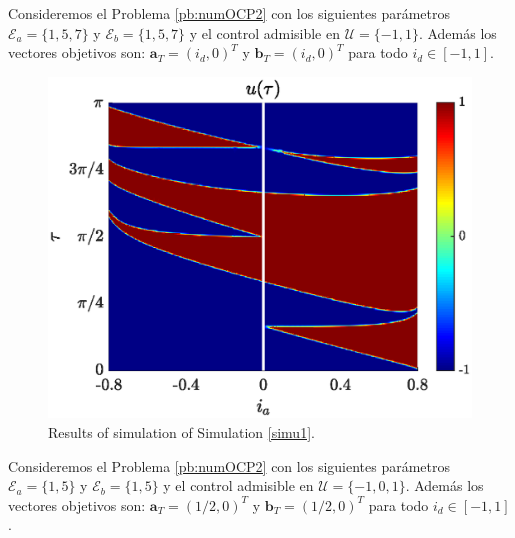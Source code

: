 
\vspace{1em}
\begin{simulation}\label{simu1}
Consideremos el Problema \ref{pb:numOCP2} con los siguientes parámetros $\mathcal{E}_a = \{1,5,7\}$ y  $\mathcal{E}_b = \{1,5,7\}$ y el control admisible en $\mathcal{U} = \{-1,1\}$. Además los vectores objetivos son: $\bm{a}_T = (i_d,0)^T$ y $\bm{b}_T = (i_d,0)^T$ para todo $i_d \in [-1,1]$. 

\begin{figure}[ht!]
    \hspace{0.05em}
    \includegraphics[scale=0.565]{img/fig05.eps}
    \caption{Results of simulation of Simulation \ref{simu1}.}
\end{figure} 
\end{simulation}

\vspace{1em}
\begin{simulation}\label{simu2}

Consideremos el Problema \ref{pb:numOCP2} con los siguientes parámetros $\mathcal{E}_a = \{1,5\}$ y  $\mathcal{E}_b = \{1,5\}$ y el control admisible en $\mathcal{U} = \{-1,0,1\}$. Además los vectores objetivos son: $\bm{a}_T = (1/2,0)^T$ y $\bm{b}_T = (1/2,0)^T$  para todo $i_d \in [-1,1]$.  
\end{simulation}

